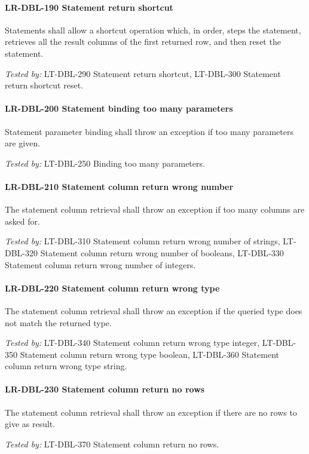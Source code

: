 \paragraph{LR-DBL-190 Statement return shortcut}
Statements shall allow a shortcut operation which, in order, steps
the statement, retrieves all the result columns of the first returned
row, and then reset the statement.

\textit{Tested by: } LT-DBL-290 Statement return shortcut,
LT-DBL-300 Statement return shortcut reset.

\paragraph{LR-DBL-200 Statement binding too many parameters}
Statement parameter binding shall throw an exception if
too many parameters are given.

\textit{Tested by: } LT-DBL-250 Binding too many parameters.

\paragraph{LR-DBL-210 Statement column return wrong number}
The statement column retrieval shall throw an exception if too many
columns are asked for.

\textit{Tested by: } LT-DBL-310 Statement column return wrong number of strings,
LT-DBL-320 Statement column return wrong number of booleans,
LT-DBL-330 Statement column return wrong number of integers.

\paragraph{LR-DBL-220 Statement column return wrong type}
The statement column retrieval shall throw an exception if the
queried type does not match the returned type.

\textit{Tested by: } LT-DBL-340 Statement column return wrong type integer,
LT-DBL-350 Statement column return wrong type boolean,
LT-DBL-360 Statement column return wrong type string.

\paragraph{LR-DBL-230 Statement column return no rows}
The statement column retrieval shall throw an exception if
there are no rows to give as result.

\textit{Tested by: } LT-DBL-370 Statement column return no rows.

